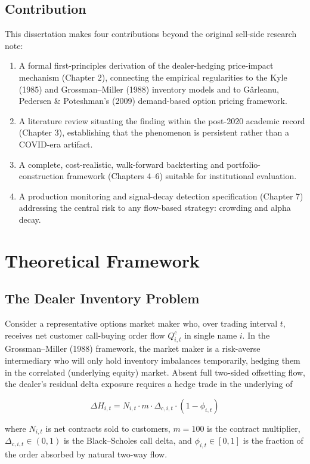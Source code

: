 \documentclass[11pt]{report}
\begin{document}
\section{Contribution}
This dissertation makes four contributions beyond the original sell-side research note:
\begin{enumerate}
    \item A formal first-principles derivation of the dealer-hedging price-impact
    mechanism (Chapter 2), connecting the empirical regularities to the Kyle (1985) and
    Grossman--Miller (1988) inventory models and to Gârleanu, Pedersen \& Poteshman's
    (2009) demand-based option pricing framework.
    \item A literature review situating the finding within the post-2020 academic record
    (Chapter 3), establishing that the phenomenon is persistent rather than a
    COVID-era artifact.
    \item A complete, cost-realistic, walk-forward backtesting and portfolio-construction
    framework (Chapters 4--6) suitable for institutional evaluation.
    \item A production monitoring and signal-decay detection specification (Chapter 7)
    addressing the central risk to any flow-based strategy: crowding and alpha decay.
\end{enumerate}

\chapter{Theoretical Framework}

\section{The Dealer Inventory Problem}
Consider a representative options market maker who, over trading interval $t$, receives
net customer call-buying order flow $Q_{i,t}^{c}$ in single name $i$. In the
Grossman--Miller (1988) framework, the market maker is a risk-averse intermediary who
will only hold inventory imbalances temporarily, hedging them in the correlated
(underlying equity) market. Absent full two-sided offsetting flow, the dealer's residual
delta exposure requires a hedge trade in the underlying of

\begin{equation}
    \Delta H_{i,t} = N_{i,t} \cdot m \cdot \Delta_{c,i,t} \cdot (1-\phi_{i,t})
\end{equation}

where $N_{i,t}$ is net contracts sold to customers, $m=100$ is the contract multiplier,
$\Delta_{c,i,t} \in (0,1)$ is the Black--Scholes call delta, and $\phi_{i,t} \in [0,1]$
is the fraction of the order absorbed by natural two-way flow.
\end{document}
